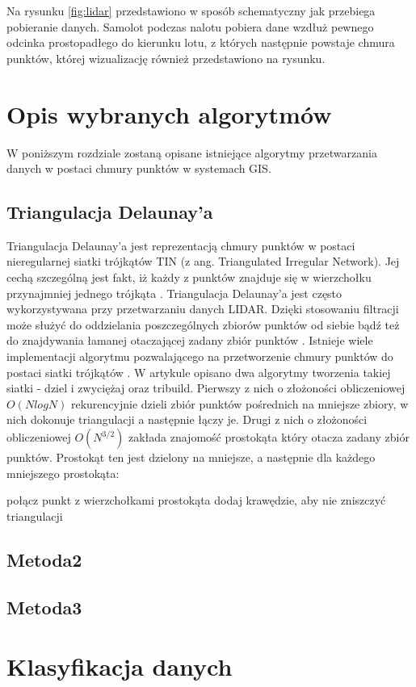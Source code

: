 Na rysunku \ref{fig:lidar} przedstawiono w sposób schematyczny jak przebiega pobieranie danych. Samolot podczas nalotu pobiera dane wzdłuż pewnego odcinka prostopadłego do kierunku lotu, z których następnie powstaje chmura punktów, której wizualizację również przedstawiono na rysunku.

\section{Opis wybranych algorytmów}

W poniższym rozdziale zostaną opisane istniejące algorytmy przetwarzania danych w postaci chmury punktów w systemach GIS.

\subsection{Triangulacja Delaunay'a}

Triangulacja Delaunay'a jest reprezentacją chmury punktów w postaci nieregularnej siatki trójkątów TIN (z ang. Triangulated Irregular Network). Jej cechą szczególną jest fakt, iż każdy z punktów znajduje się w wierzchołku przynajmniej jednego trójkąta \cite{Lee1980}. Triangulacja Delaunay'a jest często wykorzystywana przy przetwarzaniu danych LIDAR. Dzięki stosowaniu filtracji może służyć do oddzielania poszczególnych zbiorów punktów od siebie \cite{koziol2007} bądź też do znajdywania łamanej otaczającej zadany zbiór punktów \cite{website:HumanGeoBlog}. Istnieje wiele implementacji algorytmu pozwalającego na przetworzenie chmury punktów do postaci siatki trójkątów \cite{Lee1980,Dwyer1987,jiang2010}. W artykule \cite{Lee1980} opisano dwa algorytmy tworzenia takiej siatki - dziel i zwyciężaj oraz tribuild. Pierwszy z nich o złożoności obliczeniowej $O(N log N)$ rekurencyjnie dzieli zbiór punktów pośrednich na mniejsze zbiory, w nich dokonuje triangulacji a następnie łączy je. Drugi z nich o złożoności obliczeniowej $O(N^{3/2})$ zakłada znajomość prostokąta który otacza zadany zbiór punktów. Prostokąt ten jest dzielony na mniejsze, a następnie dla każdego mniejszego prostokąta:

\begin{algorithmic}
        \State połącz punkt z wierzchołkami prostokąta
    \Else
        \State dodaj krawędzie, aby nie zniszczyć triangulacji
    \EndIf
\end{algorithmic}


\subsection{Metoda2}

\subsection{Metoda3}

\section{Klasyfikacja danych}
